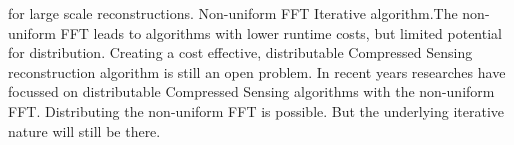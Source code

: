  for large scale reconstructions. Non-uniform FFT Iterative algorithm.The non-uniform FFT leads to algorithms with lower runtime costs, but limited potential for distribution. Creating a cost effective, distributable Compressed Sensing reconstruction algorithm is still an open problem. 
In recent years researches have focussed on distributable Compressed Sensing algorithms\cite{dabbech2018cygnus, pratley2018fast} with the non-uniform FFT.
Distributing the non-uniform FFT is possible\cite{kunisnonequispaced}. But the underlying iterative nature will still be there.











